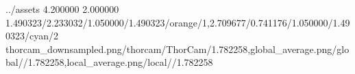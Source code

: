 \TrioComparisonFigure
    {../assets}
    {4.200000}
    {2.000000}
    {1.490323/2.233032/1.050000/1.490323/orange/1,2.709677/0.741176/1.050000/1.490323/cyan/2}
    {thorcam_downsampled.png/thorcam/ThorCam/1.782258,global_average.png/global//1.782258,local_average.png/local//1.782258}
